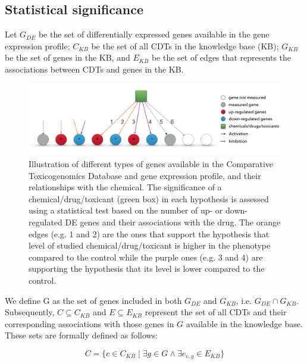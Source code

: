 \subsection{Statistical significance}


Let $G_{DE}$ be the set of differentially expressed genes available in the gene expression profile; $C_{KB}$ be the set of all CDTs in the knowledge base (KB); $G_{KB}$ be the set of genes in the KB, and $E_{KB}$ be the set of edges that represents the associations between CDTs and genes in the KB. 

\begin{figure}
\centering
  \includegraphics[width=1\linewidth]{../Figures/SecondEvidence.pdf}
  \caption{Illustration of different types of genes available in the Comparative Toxicogenomics Database and gene expression profile, and their relationships with the chemical. The significance of a chemical/drug/toxicant (green box) in each hypothesis is assessed using a statistical test based on the number of up- or down-regulated DE genes and their associations with the drug. The orange edges (e.g. 1 and 2) are the ones that support the hypothesis that level of studied chemical/drug/toxicant is higher in the phenotype compared to the control while the purple ones (e.g. 3 and 4) are supporting the hypothesis that its level is lower compared to the control.}
  \label{fig:SignificantDrug}
\end{figure}

We define G as  the set of genes included in both $G_{DE}$ and $G_{KB}$, i.e.  $G_{DE} \cap G_{KB}$. Subsequently, $C \subseteq C_{KB}$  and $E \subseteq E_{KB}$ represent the set of all CDTs and their corresponding associations with those genes in $G$ available in the knowledge base. These sets are formally defined as follows:

\begin{equation}C = \{c \in C_{KB} \mid \exists g \in G \land \exists e_{c,g} \in E_{KB} \}\end{equation}

